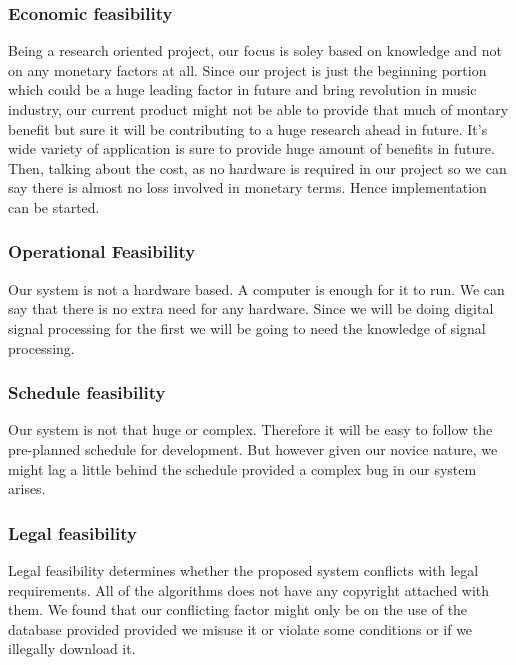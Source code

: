 \subsubsection{Economic feasibility}
Being a research oriented project, our focus is soley based on knowledge and not on any monetary factors at all.
Since our project is just the beginning portion which could be a huge leading factor in future and bring
revolution in music industry, our current product might not be able to provide that much of montary benefit but sure it will be contributing to a huge research ahead in future.
It's wide variety of application is sure to provide huge amount of benefits in future.
Then, talking about the cost, as no hardware is required in our project so we can say there is almost no loss involved in monetary terms. Hence implementation can be started.

\subsubsection{Operational Feasibility}
Our system is not a hardware based. A computer is enough for it to run. We can say that there is no extra need for any hardware. Since we will be doing digital signal processing for the first we will be going to need
the knowledge of signal processing.

\subsubsection{Schedule feasibility}
Our system is not that huge or complex. Therefore it will be easy to follow the pre-planned schedule for development. But however given our novice nature, we might lag a little behind the schedule provided a complex bug in our system arises.

\subsubsection{Legal feasibility}
Legal feasibility determines whether the proposed system conflicts with legal requirements.
All of the algorithms does not have any copyright attached with them. We found that our conflicting factor might only be on the use of the database provided provided we misuse it or violate some conditions or if 
we illegally download it.


